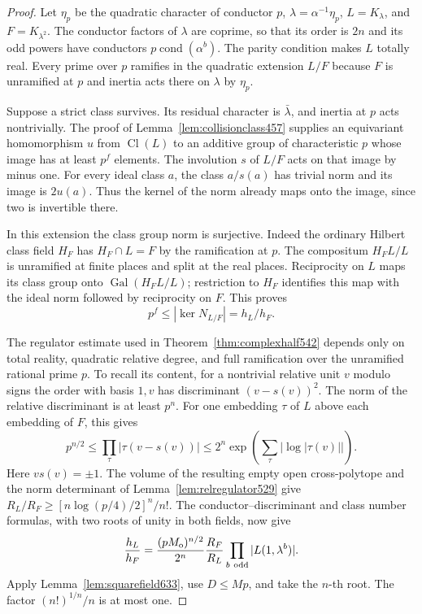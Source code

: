 \documentclass[a4paper,11pt]{article}
\theoremstyle{definition}
\theoremstyle{remark}
\numberwithin{equation}{section}
\begin{document}
\begin{proof}
Let \(\eta_p\) be the quadratic character of conductor \(p\),
\(\lambda=\alpha^{-1}\eta_p\), \(L=K_\lambda\),
and \(F=K_{\lambda^2}\). The conductor factors of \(\lambda\)
are coprime, so that its order is \(2n\) and its odd powers have
conductors \(p\operatorname{cond}(\alpha^b)\). The parity condition
makes \(L\) totally real. Every prime over \(p\) ramifies in the
quadratic extension \(L/F\) because \(F\) is unramified at \(p\)
and inertia acts there on \(\lambda\) by \(\eta_p\).

Suppose a strict class survives. Its residual character is
\(\bar\lambda\), and inertia at \(p\) acts nontrivially.
The proof of Lemma~\ref{lem:collisionclass457} supplies an
equivariant homomorphism \(u\) from \(\operatorname{Cl}(L)\) to
an additive group of characteristic \(p\) whose image has at
least \(p^f\) elements. The involution \(s\) of \(L/F\) acts on
that image by minus one. For every ideal class \(a\), the class
\(a/s(a)\) has trivial norm and its image is \(2u(a)\). Thus
the kernel of the norm already maps onto the image, since two
is invertible there.

In this extension the class group norm is surjective. Indeed the
ordinary Hilbert class field \(H_F\) has \(H_F\cap L=F\) by the
ramification at \(p\). The compositum \(H_FL/L\) is unramified
at finite places and split at the real places. Reciprocity on
\(L\) maps its class group onto \(\operatorname{Gal}(H_FL/L)\);
restriction to \(H_F\) identifies this map with the ideal norm
followed by reciprocity on \(F\). This proves
\[
                 p^f\le|\ker N_{L/F}|=h_L/h_F .
\]

The regulator estimate used in Theorem~\ref{thm:complexhalf542}
depends only on total reality, quadratic relative degree, and full
ramification over the unramified rational prime \(p\). To recall its
content, for a nontrivial relative unit \(v\) modulo signs the order
with basis \(1,v\) has discriminant \((v-s(v))^2\). The norm of the
relative discriminant is at least \(p^n\). For one embedding
\(\tau\) of \(L\) above each embedding of \(F\), this gives
\[
 p^{n/2}\le\prod_\tau|\tau(v-s(v))|
       \le 2^n\exp\left(\sum_\tau|\log|\tau(v)||\right).
\]
Here \(v s(v)=\pm1\). The volume of the resulting empty open
cross-polytope and the norm determinant of
Lemma~\ref{lem:relregulator529} give
\(R_L/R_F\ge[n\log(p/4)/2]^n/n!\).
The conductor--discriminant and class number formulas, with two
roots of unity in both fields, now give
\[
 \frac{h_L}{h_F}
  =\frac{(p M_{\rm o})^{n/2}}{2^n}
        \frac{R_F}{R_L}\prod_{b\ {\rm odd}}|L(1,\lambda^b)|.
\]
Apply Lemma~\ref{lem:squarefield633}, use \(D\le Mp\), and take
the \(n\)-th root. The factor \((n!)^{1/n}/n\) is at most one.
\end{proof}
\end{document}
